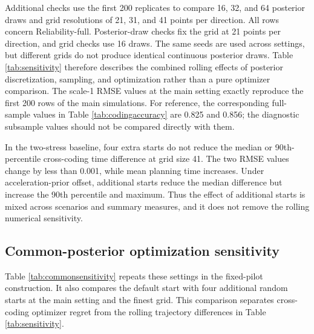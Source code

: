 \documentclass[a4paper,fleqn]{cas-sc}
\begin{document}
Additional checks use the first 200 replicates to compare 16, 32, and 64 posterior draws and grid resolutions of 21, 31, and 41 points per direction. All rows concern Reliability-full. Posterior-draw checks fix the grid at 21 points per direction, and grid checks use 16 draws. The same seeds are used across settings, but different grids do not produce identical continuous posterior draws. Table \ref{tab:sensitivity} therefore describes the combined rolling effects of posterior discretization, sampling, and optimization rather than a pure optimizer comparison. The scale-1 RMSE values at the main setting exactly reproduce the first 200 rows of the main simulations. For reference, the corresponding full-sample values in Table \ref{tab:codingaccuracy} are 0.825 and 0.856; the diagnostic subsample values should not be compared directly with them.

\begin{table}[pos=H]
\centering
\caption{Rolling numerical sensitivity over the first 200 replicates. Extra starts are added to the equally spaced and available warm starts; four extra starts are examined at grid size 41. $\Delta t$ is the maximum inspection-time difference between scale 1 and scale 10. Seconds include only the planning optimizer and exclude posterior grid construction and final estimation. RMSE values are based on the first 200 replicates and are not directly comparable with the full-sample values in Table \ref{tab:codingaccuracy}.}
\label{tab:sensitivity}
\resizebox{\textwidth}{!}{}
\end{table}

In the two-stress baseline, four extra starts do not reduce the median or 90th-percentile cross-coding time difference at grid size 41. The two RMSE values change by less than 0.001, while mean planning time increases. Under acceleration-prior offset, additional starts reduce the median difference but increase the 90th percentile and maximum. Thus the effect of additional starts is mixed across scenarios and summary measures, and it does not remove the rolling numerical sensitivity.

\subsection{Common-posterior optimization sensitivity}

Table \ref{tab:commonsensitivity} repeats these settings in the fixed-pilot construction. It also compares the default start with four additional random starts at the main setting and the finest grid. This comparison separates cross-coding optimizer regret from the rolling trajectory differences in Table \ref{tab:sensitivity}.
\end{document}

